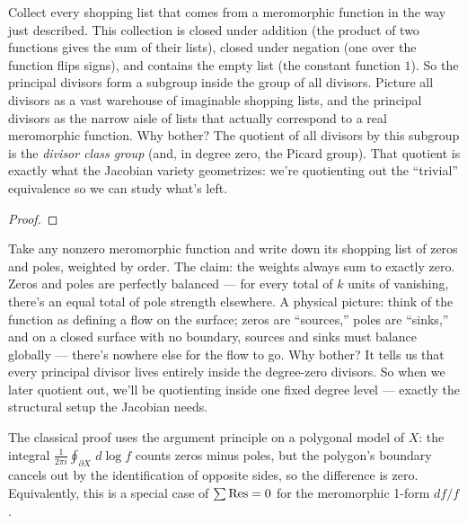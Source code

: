 \begin{layman}
Collect every shopping list that comes from a meromorphic function in the
way just described. This collection is closed under addition (the product
of two functions gives the sum of their lists), closed under negation (one
over the function flips signs), and contains the empty list (the constant
function \(1\)). So the principal divisors form a subgroup inside the group
of all divisors. Picture all divisors as a vast warehouse of imaginable
shopping lists, and the principal divisors as the narrow aisle of lists
that actually correspond to a real meromorphic function. Why bother?
The quotient of all divisors by this subgroup is the
\emph{divisor class group} (and, in degree zero, the Picard group). That
quotient is exactly what the Jacobian variety geometrizes: we're
quotienting out the ``trivial'' equivalence so we can study what's left.
\end{layman}


\begin{proof}\leanok\end{proof}

\begin{layman}
Take any nonzero meromorphic function and write down its shopping list of
zeros and poles, weighted by order. The claim: the weights always sum to
exactly zero. Zeros and poles are perfectly balanced --- for every total of
\(k\) units of vanishing, there's an equal total of pole strength elsewhere.
A physical picture: think of the function as defining a flow on the surface;
zeros are ``sources,'' poles are ``sinks,'' and on a closed surface with
no boundary, sources and sinks must balance globally --- there's nowhere
else for the flow to go. Why bother? It tells us that every principal
divisor lives entirely inside the degree-zero divisors. So when we later
quotient out, we'll be quotienting inside one fixed degree level --- exactly
the structural setup the Jacobian needs.
\end{layman}

\begin{proofsketch}
The classical proof uses the argument principle on a polygonal model of
\(X\): the integral
\(\frac{1}{2\pi i}\oint_{\partial X}\,d\!\log f\) counts zeros minus
poles, but the polygon's boundary cancels out by the identification of
opposite sides, so the difference is zero. Equivalently, this is a
special case of \(\sum\operatorname{Res} = 0\) for the meromorphic 1-form \(df/f\).
\end{proofsketch}

